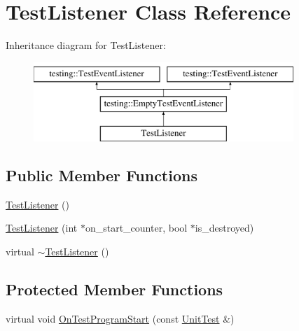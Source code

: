 \hypertarget{class_test_listener}{\section{Test\-Listener Class Reference}
\label{class_test_listener}
}
Inheritance diagram for Test\-Listener\-:\begin{figure}[H]
\begin{center}
\leavevmode
\includegraphics[height=3.000000cm]{class_test_listener}
\end{center}
\end{figure}
\subsection*{Public Member Functions}
\begin{DoxyCompactItemize}
\item 
\hyperlink{class_test_listener_ae20c874ce92777371de6d024df229e9f}{Test\-Listener} ()
\item 
\hyperlink{class_test_listener_ab65604c6c3742c494e9378e770da5d42}{Test\-Listener} (int $\ast$on\-\_\-start\-\_\-counter, bool $\ast$is\-\_\-destroyed)
\item 
virtual \hyperlink{class_test_listener_ae59dec3ae673618185eebf71881902e9}{$\sim$\-Test\-Listener} ()
\end{DoxyCompactItemize}
\subsection*{Protected Member Functions}
\begin{DoxyCompactItemize}
\item 
virtual void \hyperlink{class_test_listener_a6218f522f5b6b37050ff0ea630ac5fd3}{On\-Test\-Program\-Start} (const \hyperlink{classtesting_1_1_unit_test}{Unit\-Test} \&)
\end{DoxyCompactItemize}


